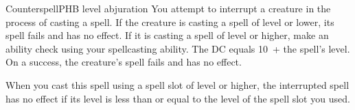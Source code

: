 \begin{spell}{Counterspell}{PHB}{ level abjuration}
{
}
You attempt to interrupt a creature in the process of
casting a spell. If the creature is casting a spell of 
level or lower, its spell fails and has no effect. If it is
casting a spell of  level or higher, make an ability
check using your spellcasting ability. The DC equals 10~+
the spell's level. On a success, the creature's spell fails
and has no effect.

 When you cast this spell using a
spell slot of  level or higher, the interrupted spell has
no effect if its level is less than or equal to the level of the
spell slot you used.
\end{spell}